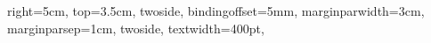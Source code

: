 {{                  %
   right=5cm,       %
   top=3.5cm,         %
   twoside,       %
   bindingoffset=5mm,  %
   marginparwidth=3cm, %
   marginparsep=1cm,%
   twoside,
   textwidth=400pt,   %
}
} %

